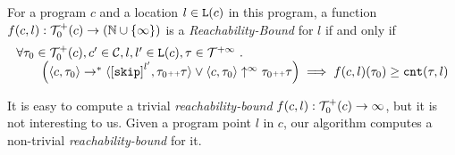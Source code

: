 \begin{defn}
  \label{def:rb}
  For a program ${c}$ and a location $l \in \mathtt{L}(c)$ in this program,
a function $f(c, l) : \mathcal{T}^{+}_0(c) \to (\mathbb{N} \cup \{\infty\})$ is a \emph{Reachability-Bound} for $l$ if and only if
{\small
\[
\begin{array}{l}
  \forall \trace_0 \in \ftdom_0(c), c' \in \cdom, l, l' \in \lvar(c), \trace \in \tdom \st 
  \\ \qquad
  \Big(
    \config{{c}, \trace_0} \to^{*} \config{\clabel{\eskip}^{l'}, \trace_0 \tracecat \trace} 
    \lor 
    \config{{c}, \trace_0} \uparrow^{\infty} \trace_0 \tracecat \trace 
  \Big)
  \implies f({c}, l)(\trace_0) \geq \counter(\trace, l) 
  \end{array}
  \]
}
\end{defn}
It is easy to compute a trivial \emph{reachability-bound} $f(c, l): \mathcal{T}^{+}_0(c) \to \infty$, but it is not interesting to us.
Given a program point $l$ in $c$, our algorithm computes a non-trivial \emph{reachability-bound} for it.
